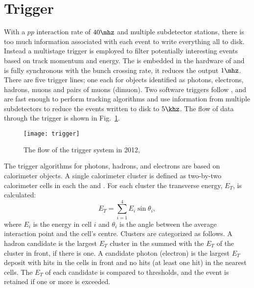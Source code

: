 \section{Trigger}
\label{sec:lhcb:trig}

With a $pp$ interaction rate of $40\mhz$ and multiple subdetector stations, there is too much
information associated with each event to write everything all to disk.
Instead a multistage trigger is employed to filter potentially interesting events based on track
momentum and energy.
The \lone is embedded in the hardware of \lhcb and is fully synchronous with
the bunch crossing rate, it reduces the output $1\mhz$.
There are five \lone trigger lines; one each for objects identified as
photons, electrons, hadrons, muons and pairs of muons (dimuon).
Two software triggers follow \lone, and are fast enough to perform tracking algorithms and use
information from
multiple subdetectors to reduce the events written to disk to $5\khz$.
The flow of data through the trigger is shown in Fig.~\ref{fig:lhcb:trigger}.

\begin{figure}
  \begin{center}
    \texttt{[image: trigger]}
  \end{center}
  \caption[LHCb trigger sequence in 2012]
  {
    The flow of the \lhcb trigger system in 2012,
  }
  \label{fig:lhcb:trigger}
\end{figure}

The \lone trigger algorithms for photons, hadrons, and electrons are based on calorimeter objects.
A single calorimeter cluster is defined as two-by-two calorimeter cells in each the \ecal and
\hcal.
For each cluster the transverse energy, $E_T$, is calculated:
\begin{equation}
  E_T = \sum_{i=1}^4E_i\sin\theta_i,
\end{equation}
where $E_i$ is the energy in cell $i$ and $\theta_i$ is the angle between the average
interaction point and the cell's centre.
Clusters are categorized as follows.
A hadron candidate is the largest $E_T$ cluster in the \hcal summed with the $E_T$ of the \ecal
cluster in front, if there is one.
A candidate photon (electron) is the largest $E_T$ deposit with hits in the \presh cells in front and
no hits (at least one hit) in the nearest \spd cells.
The $E_T$ of each candidate is compared to thresholds, and the event is retained if one or more is
exceeded.

